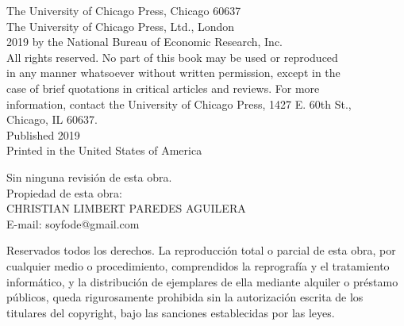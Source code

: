 \begin{titlingpage}
\nbvspace[1]
The University of Chicago Press, Chicago 60637\\
The University of Chicago Press, Ltd., London\\
 2019 by the National Bureau of Economic Research, Inc.\\
All rights reserved. No part of this book may be used or reproduced\\
in any manner whatsoever without written permission, except in the\\
case of brief quotations in critical articles and reviews. For more\\
information, contact the University of Chicago Press, 1427 E. 60th St.,\\
Chicago, IL 60637.\\
Published 2019\\
Printed in the United States of America\\
\nbvspace[1]

\begin{center}
Sin ninguna revisión de esta obra.\\


\nbvspace[1]
    Propiedad de esta obra:\\ 

    CHRISTIAN LIMBERT PAREDES AGUILERA\\	

    E-mail: soyfode@gmail.com
\end{center}

\nbvspace[1]

Reservados todos los derechos. La reproducción total o parcial de esta obra, por cualquier medio o procedimiento, comprendidos la reprografía y el tratamiento informático, y la distribución de ejemplares de ella mediante alquiler o préstamo públicos, queda rigurosamente prohibida sin la autorización escrita de los titulares del copyright, bajo las sanciones establecidas por las leyes.\\


\end{titlingpage}



\tableofcontents								%

\pagestyle{fancy}
\fancyhead[LE,RO]{\nouppercase{\truncate{0.5\headwidth}{\rightmark}}}
\fancyhead[LO,RE]{\nouppercase{\truncate{0.5\headwidth}{\leftmark}}}


